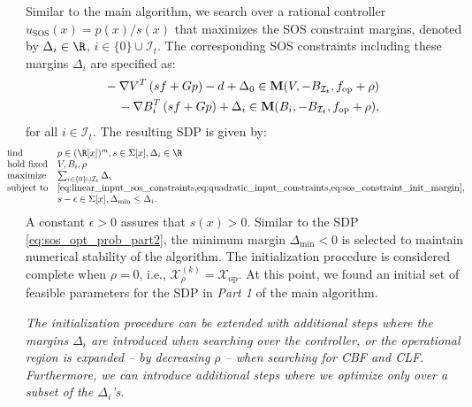 Similar to the main algorithm, we search over a rational controller $u_\text{SOS}(x) = p(x)/s(x)$ that maximizes the SOS constraint margins, denoted by $\Delta_i \in \R$, $i \in \{ 0 \} \cup \mathcal I_t$.
The corresponding SOS constraints including these margins $\Delta_i$ are specified as:
\begin{subequations} \label{eq:sos_constraint_init_margin}
   \begin{align}
      \begin{split}
         &-\nabla V^T \left ( s f + G p \right ) - d + \Delta_0 \in \textbf M(V, -B_{\mathcal I_t}, f_\text{op} + \rho)
      \end{split} \\
      \begin{split}
         &-\nabla B_i^T \left ( s f + G p \right ) + \Delta_i \in \textbf M(B_i, -B_{\mathcal I_t}, f_\text{op} + \rho),
      \end{split}
   \end{align}
\end{subequations}
for all $i \in \mathcal I_t$.
The resulting SDP is given by:
\begin{align*}
   \hspace{-\leftmargin}
   \begin{array}{lll}
      \mbox{find} & p \in (\R[x])^m, s \in \Sigma[x], \Delta_i \in \R \\
      \mbox{hold fixed} & V, B_i, \rho \\
      \mbox{maximize} & \sum_{i \in \{0\} \cup \mathcal I_t} \Delta_i \\
      \mbox{subject to} & \text{\cref{eq:linear_input_sos_constraints,eq:quadratic_input_constraints,eq:sos_constraint_init_margin}}, \\
      & s - \epsilon \in \Sigma[x], \Delta_\text{min} \leq \Delta_i.
   \end{array}
\end{align*}
A constant $\epsilon > 0$ assures that $s(x) > 0$.
Similar to the SDP \cref{eq:sos_opt_prob_part2}, the minimum margin $\Delta_\text{min} < 0$ is selected to maintain numerical stability of the algorithm.
The initialization procedure is considered complete when $\rho = 0$, i.e., $\mathcal X_\rho^{(k)} = \mathcal X_\text{op}$.
At this point, we found an initial set of feasible parameters for the SDP in \textit{Part 1} of the main algorithm.
\begin{remark}
   \textit{
      The initialization procedure can be extended with additional steps where the margins $\Delta_i$ are introduced when searching over the controller, or the operational region is expanded -- by decreasing $\rho$ -- when searching for CBF and CLF. 
      Furthermore, we can introduce additional steps where we optimize only over a subset of the $\Delta_i$'s.
   }
\end{remark}